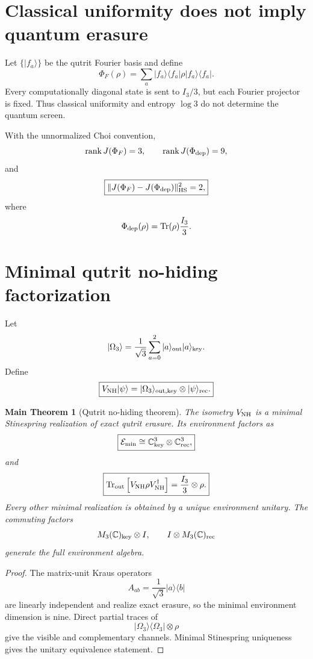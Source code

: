 \documentclass[11pt,oneside,openany]{book}
\numberwithin{equation}{chapter}
\newtheorem{maintheorem}[theorem]{Main Theorem}
\theoremstyle{definition}
\theoremstyle{remark}
\newcommand{\C}{\mathbb C}
\newcommand{\Tr}{\operatorname{Tr}}
\newcommand{\rank}{\operatorname{rank}}
\newcommand{\norm}[1]{\lVert #1\rVert}
\begin{document}
\section{Classical uniformity does not imply quantum erasure}

Let \(\{|f_a\rangle\}\) be the qutrit Fourier basis and define
\[
 \Phi_F(\rho)=\sum_a|f_a\rangle\langle f_a|\rho|f_a\rangle\langle f_a|.
\]
Every computationally diagonal state is sent to \(I_3/3\), but each Fourier
projector is fixed.  Thus classical uniformity and entropy \(\log3\) do not
determine the quantum screen.

With the unnormalized Choi convention,
\[
 \rank J(\Phi_F)=3,
 \qquad
 \rank J(\Phi_{\rm dep})=9,
\]
and
\[
 \boxed{
 \norm{J(\Phi_F)-J(\Phi_{\rm dep})}_{\rm HS}^2=2,}
\]
where
\[
 \Phi_{\rm dep}(\rho)=\Tr(\rho)\frac{I_3}{3}.
\]

\section{Minimal qutrit no-hiding factorization}

Let
\[
 |\Omega_3\rangle
 =
 \frac1{\sqrt3}\sum_{a=0}^2
 |a\rangle_{\rm out}|a\rangle_{\rm key}.
\]
Define
\[
 \boxed{
 V_{\rm NH}|\psi\rangle
 =
 |\Omega_3\rangle_{\rm out,key}\otimes|\psi\rangle_{\rm rec}.}
\]

\begin{maintheorem}[Qutrit no-hiding theorem]
\label{thm:qutrit-no-hiding}
The isometry \(V_{\rm NH}\) is a minimal Stinespring realization of exact
qutrit erasure.  Its environment factors as
\[
 \boxed{
 \mathcal E_{\min}
 \cong
 \C^3_{\rm key}\otimes\C^3_{\rm rec},}
\]
and
\[
 \boxed{
 \Tr_{\rm out}
 \left[
 V_{\rm NH}\rho V_{\rm NH}^\dagger
 \right]
 =
 \frac{I_3}{3}\otimes\rho.}
\]
Every other minimal realization is obtained by a unique environment unitary.
The commuting factors
\[
 M_3(\C)_{\rm key}\otimes I,
 \qquad
 I\otimes M_3(\C)_{\rm rec}
\]
generate the full environment algebra.
\end{maintheorem}

\begin{proof}
The matrix-unit Kraus operators
\[
 A_{ab}=\frac1{\sqrt3}|a\rangle\langle b|
\]
are linearly independent and realize exact erasure, so the minimal
environment dimension is nine.  Direct partial traces of
\[
 |\Omega_3\rangle\langle\Omega_3|\otimes\rho
\]
give the visible and complementary channels.  Minimal Stinespring uniqueness
gives the unitary equivalence statement.
\end{proof}
\end{document}
